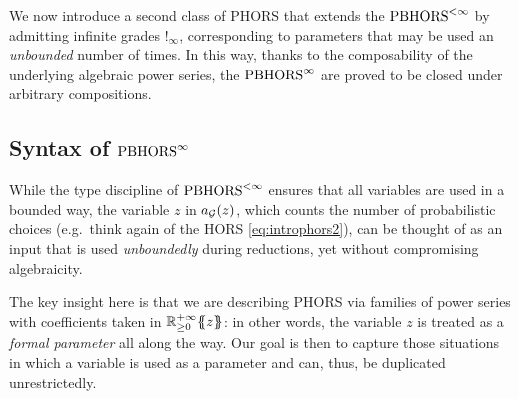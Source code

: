 
We now introduce a second class of PHORS that extends the $\text{PBHORS}^{<\infty}$ by admitting infinite grades $!_\infty$, corresponding to parameters that may be used an \emph{unbounded} number of times. In this way, thanks to the composability of the underlying algebraic power series, the $\text{PBHORS}^{\infty}$ are proved to be closed under arbitrary {compositions}.


 
 
\subsection{Syntax of $\text{PBHORS}^{\infty}$}


While the type discipline of $\text{PBHORS}^{<\infty}$ ensures that all variables are used in a bounded way,
the variable $z$ in $a_{\mathcal{G}}(z)$, which counts the number of probabilistic choices (e.g.~think again of the HORS \eqref{eq:introphors2}), can be thought of as an input that is used \emph{unboundedly} during reductions, yet without compromising algebraicity.

The key insight here is that we are describing PHORS via families of power series with coefficients taken in ${\mathbb{R}^{+\infty}_{\geq 0}}\{\!\!\{z\}\!\!\}$: in other words, the variable $z$ is treated as a \emph{formal parameter} all along the way.
Our goal is then to capture those situations in which a variable is used as a parameter and can, thus, be duplicated unrestrictedly.


